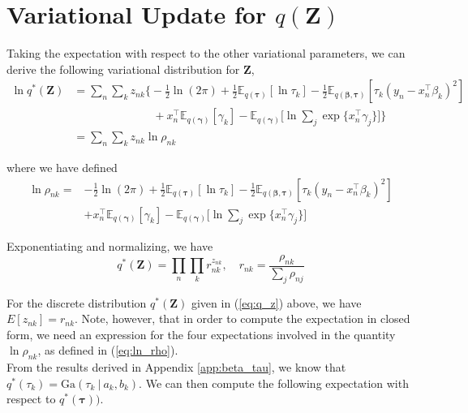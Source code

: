 \documentclass[twoside,11pt]{article}
\newcommand{\tr}{\intercal}
\newcommand\given[1][]{\:#1\vert\:}
\newcommand{\E}{\mathbb{E}}
\begin{document}
\appendix
\section{Variational Update for $q(\mathbf{Z})$} 
\label{app:q_z}

Taking the expectation with respect to the other variational parameters, we can derive the following variational distribution for $\mathbf{Z}$,
\begin{align*}
	\ln q^{*}(\mathbf{Z}) &= \sum_n \sum_k z_{nk} \Bigg\{  -\frac{1}{2}\ln(2\pi) + \frac{1}{2} \E_{q(\boldsymbol\tau)}[ \ln \tau_k ] - \frac{1}{2} \E_{q(\boldsymbol\beta, \boldsymbol\tau)}[\tau_k (y_n - x_n^{\tr}\beta_k)^2] \\ 
	&\qquad \qquad \qquad \quad + x_n^{\tr}\E_{q(\boldsymbol\gamma)}[\gamma_k] - \E_{q(\boldsymbol\gamma)}\Bigg[\ln \sum_{j} \exp \{ x_n^{\tr} \gamma_j \}\Bigg]\Bigg\} \\
	&= \sum_n \sum_k z_{nk} \ln \rho_{nk}
\end{align*}

where we have defined 
\begin{equation} \label{eq:ln_rho}
\begin{split}
 \ln \rho_{nk} = &-\frac{1}{2}\ln(2\pi) + \frac{1}{2} \E_{q(\boldsymbol\tau)}[ \ln \tau_k ] - \frac{1}{2} \E_{q(\boldsymbol\beta, \boldsymbol\tau)}[\tau_k (y_n - x_n^{\tr}\beta_k)^2] \\ 
	& + x_n^{\tr}\E_{q(\boldsymbol\gamma)}[\gamma_k] - \E_{q(\boldsymbol\gamma)}\Bigg[\ln \sum_{j} \exp \{ x_n^{\tr} \gamma_j \} \Bigg]
\end{split}
\end{equation}


Exponentiating and normalizing, we have
\begin{equation} \label{eq:q_z}
	q^{*}(\mathbf{Z}) = \prod_{n} \prod_{k} r_{nk}^{z_{nk}}, \quad r_{nk} = \frac{\rho_{nk}}{\sum_{j} \rho_{nj}}
\end{equation}

For the discrete distribution $q^{*}(\mathbf{Z})$ given in (\ref{eq:q_z}) above, we have $E[z_{nk}] = r_{nk}$. Note, however, that in order to compute the expectation in closed form, we need an expression for the four expectations involved in the quantity $\ln \rho_{nk}$, as defined in (\ref{eq:ln_rho}). \\

From the results derived in Appendix \ref{app:beta_tau}, we know that $q^{*}(\tau_k) = \mathrm{Ga}(\tau_k \given a_k, b_k)$. We can then compute the following expectation with respect to $q^{*}(\boldsymbol\tau))$.
\end{document}
